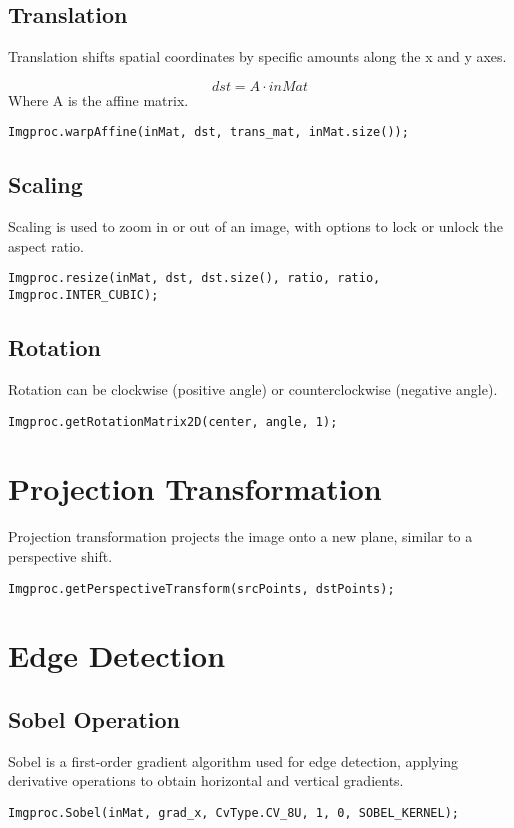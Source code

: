 \documentclass{article}
\begin{document}
	\subsection{Translation}
	Translation shifts spatial coordinates by specific amounts along the x and y axes.
	
	\begin{equation}
		dst = A \cdot inMat
	\end{equation}
	Where A is the affine matrix.
	
	\texttt{Imgproc.warpAffine(inMat, dst, trans\_mat, inMat.size());}
	
	\subsection{Scaling}
	Scaling is used to zoom in or out of an image, with options to lock or unlock the aspect ratio.
	
	\texttt{Imgproc.resize(inMat, dst, dst.size(), ratio, ratio, Imgproc.INTER\_CUBIC);}
	
	\subsection{Rotation}
	Rotation can be clockwise (positive angle) or counterclockwise (negative angle).
	
	\texttt{Imgproc.getRotationMatrix2D(center, angle, 1);}
	
	\section{Projection Transformation}
	Projection transformation projects the image onto a new plane, similar to a perspective shift.
	
	\texttt{Imgproc.getPerspectiveTransform(srcPoints, dstPoints);}
	
	\section{Edge Detection}
	\subsection{Sobel Operation}
	Sobel is a first-order gradient algorithm used for edge detection, applying derivative operations to obtain horizontal and vertical gradients.
	
	\texttt{Imgproc.Sobel(inMat, grad\_x, CvType.CV\_8U, 1, 0, SOBEL\_KERNEL);}
	
\end{document}
